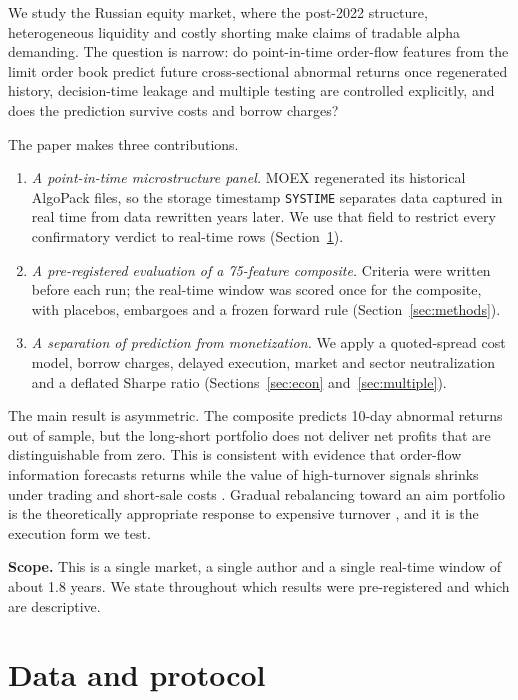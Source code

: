 \documentclass[11pt]{article}
\begin{document}
We study the Russian equity market, where the post-2022 structure, heterogeneous liquidity and costly shorting make claims of tradable alpha demanding. The question is narrow: do point-in-time order-flow features from the limit order book predict future cross-sectional abnormal returns once regenerated history, decision-time leakage and multiple testing are controlled explicitly, and does the prediction survive costs and borrow charges?

The paper makes three contributions.
\begin{enumerate}
\item \emph{A point-in-time microstructure panel.} MOEX regenerated its historical AlgoPack files, so the storage timestamp \texttt{SYSTIME} separates data captured in real time from data rewritten years later. We use that field to restrict every confirmatory verdict to real-time rows (Section~\ref{sec:data}).
\item \emph{A pre-registered evaluation of a 75-feature composite.} Criteria were written before each run; the real-time window was scored once for the composite, with placebos, embargoes and a frozen forward rule (Section~\ref{sec:methods}).
\item \emph{A separation of prediction from monetization.} We apply a quoted-spread cost model, borrow charges, delayed execution, market and sector neutralization and a deflated Sharpe ratio (Sections~\ref{sec:econ} and~\ref{sec:multiple}).
\end{enumerate}

The main result is asymmetric. The composite predicts 10-day abnormal returns out of sample, but the long-short portfolio does not deliver net profits that are distinguishable from zero. This is consistent with evidence that order-flow information forecasts returns \citep{chordia2004order,kolm2023deep,cont2023crossimpact} while the value of high-turnover signals shrinks under trading and short-sale costs \citep{muravyev2025anomalies,jensen2026implementable,ledoit2025markowitz}. Gradual rebalancing toward an aim portfolio is the theoretically appropriate response to expensive turnover \citep{garleanu2013dynamic,muhlekarbe2026dynamic,ma2022portfolio}, and it is the execution form we test.

\textbf{Scope.} This is a single market, a single author and a single real-time window of about 1.8 years. We state throughout which results were pre-registered and which are descriptive.

\section{Data and protocol}\label{sec:data}
\end{document}
